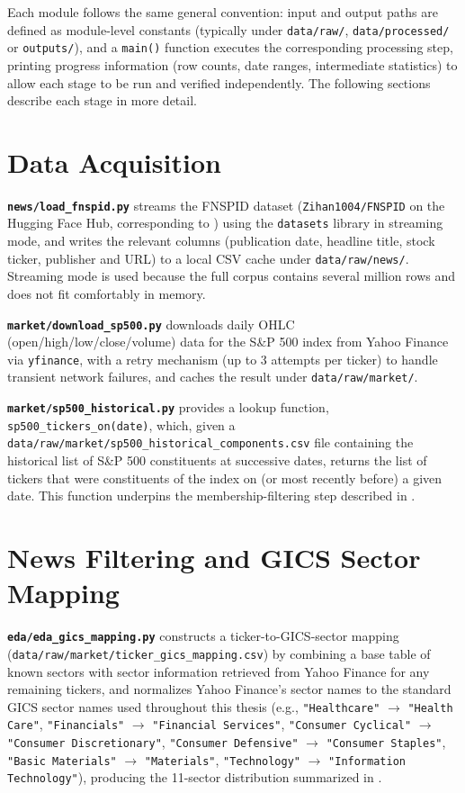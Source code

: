 Each module follows the same general convention: input and output paths
are defined as module-level constants (typically under \texttt{data/raw/},
\texttt{data/processed/} or \texttt{outputs/}), and a \texttt{main()}
function executes the corresponding processing step, printing progress
information (row counts, date ranges, intermediate statistics) to allow
each stage to be run and verified independently. The following sections
describe each stage in more detail.

\section{Data Acquisition}
\label{annex:pipeline-acquisition}

\textbf{\texttt{news/load\_fnspid.py}} streams the FNSPID dataset
(\texttt{Zihan1004/FNSPID} on the Hugging Face Hub, corresponding to
\cite{zhang2023fnspid}) using the \texttt{datasets} library in streaming
mode, and writes the relevant columns (publication date, headline title,
stock ticker, publisher and URL) to a local CSV cache under
\texttt{data/raw/news/}. Streaming mode is used because the full corpus
contains several million rows and does not fit comfortably in memory.

\textbf{\texttt{market/download\_sp500.py}} downloads daily OHLC
(open/high/low/close/volume) data for the S\&P 500 index from Yahoo
Finance via \texttt{yfinance}, with a retry mechanism (up to 3 attempts per
ticker) to handle transient network failures, and caches the result under
\texttt{data/raw/market/}.

\textbf{\texttt{market/sp500\_historical.py}} provides a lookup function,
\texttt{sp500\_tickers\_on(date)}, which, given a \texttt{data/raw/market/sp500\_historical\_components.csv}
file containing the historical list of S\&P 500 constituents at successive
dates, returns the list of tickers that were constituents of the index on
(or most recently before) a given date. This function underpins the
membership-filtering step described in .

\section{News Filtering and GICS Sector Mapping}
\label{annex:pipeline-filtering}

\textbf{\texttt{eda/eda\_gics\_mapping.py}} constructs a
ticker-to-GICS-sector mapping (\texttt{data/raw/market/ticker\_gics\_mapping.csv})
by combining a base table of known sectors with sector information
retrieved from Yahoo Finance for any remaining tickers, and normalizes
Yahoo Finance's sector names to the standard GICS sector names used
throughout this thesis (e.g., \texttt{"Healthcare"} $\to$ \texttt{"Health
Care"}, \texttt{"Financials"} $\to$ \texttt{"Financial Services"},
\texttt{"Consumer Cyclical"} $\to$ \texttt{"Consumer Discretionary"},
\texttt{"Consumer Defensive"} $\to$ \texttt{"Consumer Staples"},
\texttt{"Basic Materials"} $\to$ \texttt{"Materials"}, \texttt{"Technology"}
$\to$ \texttt{"Information Technology"}), producing the 11-sector
distribution summarized in .

